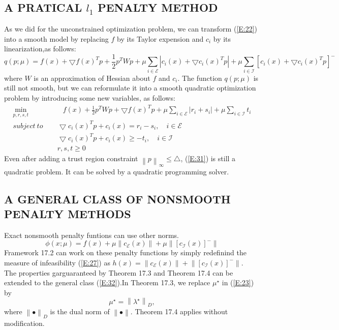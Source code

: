 \documentclass[11pt,a4paper]{article}
\renewcommand{\(}{\left(}
\renewcommand{\)}{\right)}
\newcommand{\norm}[1]{\left\|#1\right\|}
\begin{document}
\subsection*{A PRATICAL $l_1$ PENALTY METHOD}
As we did for the unconstrained optimization problem, we can transform (\ref{E:22}) into a smooth model by replacing $f$ by its Taylor expension and $c_i$ by its linearization,as follows:
\[ q(p;\mu)=f(x)+\bigtriangledown f(x)^Tp+\frac{1}{2}p^TWp+\mu\sum_{i \in \mathcal{E}}|c_i(x)+\bigtriangledown c_i(x)^Tp|+\mu\sum_{i \in \mathcal{I}}[c_i(x)+\bigtriangledown c_i(x)^Tp]^- \]
where $W$ is an approximation of Hessian about $f$ and $c_i$.
The function $q(p;\mu)$ is still not smooth, but we can reformulate it into a smooth quadratic optimization problem by introducing some new variables, as follows:
\begin{equation}\label{E:31}
\begin{split}
\min_{p,r,s,t} \quad & \quad f(x)+\frac{1}{2}p^TWp+\bigtriangledown f(x)^Tp+\mu\sum_{i \in \mathcal{E}}|r_i+s_i|+\mu\sum_{i \in \mathcal{I}}t_i \\
subject~to  \quad &~ \bigtriangledown c_i(x)^Tp+c_i(x)=r_i-s_i, \quad i \in \mathcal{E}\\
&~ \bigtriangledown c_i(x)^Tp+c_i(x) \geq -t_i, \quad i \in \mathcal{I}\\
&~ r,s,t\geq 0
\end{split}
\end{equation}
Even after adding a trust region constraint $\norm{p}_\infty \leq \bigtriangleup$, (\ref{E:31}) is still a quadratic problem. It can be solved by a quadratic programming solver.
\subsection*{A GENERAL CLASS OF NONSMOOTH PENALTY METHODS}
Exact nonsmooth penalty funtions can use other norms.
\begin{equation}\label{E:32}
\phi(x;\mu)=f(x)+\mu \norm{c_\mathcal{E}(x)}+\mu \norm{[c_\mathcal{I}(x)]^-}
\end{equation}
Framework 17.2 can work on these penalty functions by simply redefinind the measure of infeasibility (\ref{E:27}) as $h(x) = \norm{c_\mathcal{E}(x)}+\norm{[c_\mathcal{I}(x)]^-}$.\\
The properties garguaranteed by Theorem 17.3 and Theorem 17.4 can be extended to the general class (\ref{E:32}).In Theorem 17.3, we replace $\mu^\star$ in (\ref{E:23}) by
\[ \mu^\star = \norm{\lambda^\star}_D, \]
where $\norm{•}_D$ is the dual norm of $\norm{•}$. Theorem 17.4 applies without modification.
\end{document}
